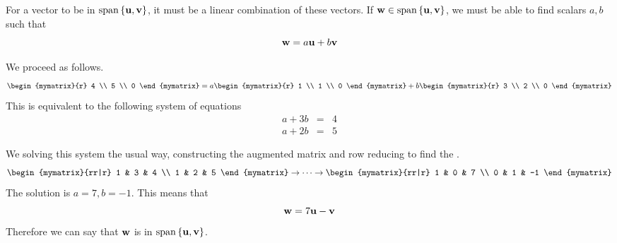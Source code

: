 \begin{solution}
For a vector to be in $\sspan \set{\vect{u}, \vect{v} }$, it must be a linear combination of these vectors. If $\vect{w} \in \sspan \set{\vect{u}, \vect{v} }$, we must be able to find scalars $a,b$ such that\[
\mbox{\bf w} = a \mbox{\bf u} +b \mbox{\bf v}
\]

We proceed as follows.
\[
\begin{mymatrix}{r}
4 \\
5 \\
0
\end{mymatrix}
=
a 
\begin{mymatrix}{r}
1 \\
1 \\
0
\end{mymatrix}
+
b
\begin{mymatrix}{r}
3 \\
2 \\
0
\end{mymatrix}
\]
This is equivalent to the following system of equations
\begin{eqnarray*}
a + 3b &=& 4 \\
a + 2b &=& 5
\end{eqnarray*}

We solving this system the usual way, constructing the augmented matrix and row reducing to find the {\rref}.
\[
\begin{mymatrix}{rr|r}
1 & 3 & 4 \\
1 & 2 & 5 
\end{mymatrix}
\rightarrow \cdots \rightarrow
\begin{mymatrix}{rr|r}
1 & 0 & 7 \\
0 & 1 & -1
\end{mymatrix}
\]
The solution is $a=7, b=-1$. This means that 
\[
\mbox{\bf w} = 7 \mbox{\bf u} - \mbox{\bf v}
\] 
Therefore we can say that $\mbox{\bf w}$ is in $\sspan \set{\vect{u}, \vect{v} }$. 
\end{solution}
